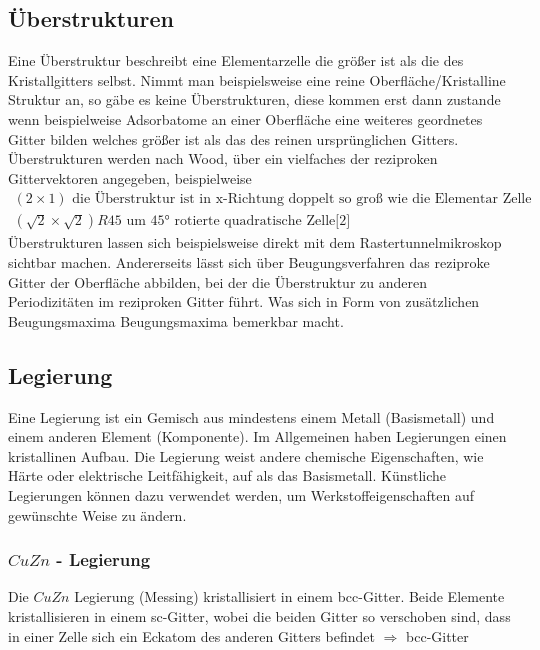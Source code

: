     \subsection{Überstrukturen}
        Eine Überstruktur beschreibt eine Elementarzelle die größer ist als die des Kristallgitters selbst.
        Nimmt man beispielsweise eine reine Oberfläche/Kristalline Struktur an, so
        gäbe es keine Überstrukturen, diese kommen erst dann zustande wenn beispielweise Adsorbatome an einer Oberfläche
        eine weiteres geordnetes Gitter bilden welches größer ist als das des reinen ursprünglichen Gitters.
        Überstrukturen werden nach Wood, über ein vielfaches der reziproken Gittervektoren angegeben, beispielweise
        \begin{align*}
            (2\times1) \text{  die Überstruktur ist in x-Richtung doppelt so groß wie die Elementar Zelle}\\
            (\sqrt{2}\times\sqrt{2})R45 \text{  um 45° rotierte quadratische Zelle[2]}
        \end{align*}
        Überstrukturen lassen sich beispielsweise direkt mit dem Rastertunnelmikroskop sichtbar machen.
        Andererseits lässt sich über Beugungsverfahren das reziproke Gitter der Oberfläche abbilden, bei der die
        Überstruktur zu anderen Periodizitäten im reziproken Gitter führt. Was sich in Form von zusätzlichen Beugungsmaxima 
        Beugungsmaxima bemerkbar macht.

        \subsection{Legierung}
            Eine Legierung ist ein Gemisch aus mindestens einem Metall (Basismetall) und einem anderen Element (Komponente). Im Allgemeinen 
            haben Legierungen einen kristallinen Aufbau. Die Legierung weist andere chemische Eigenschaften, wie Härte oder elektrische Leitfähigkeit,
            auf als das Basismetall. Künstliche Legierungen können dazu verwendet werden, um Werkstoffeigenschaften auf gewünschte Weise zu ändern.
        \subsubsection{$CuZn$ - Legierung}
            Die $CuZn$ Legierung (Messing) kristallisiert in einem bcc-Gitter. Beide Elemente kristallisieren in einem sc-Gitter,
            wobei die beiden Gitter so verschoben sind, dass in einer Zelle sich ein Eckatom des anderen Gitters befindet $\Rightarrow$ bcc-Gitter 
            
